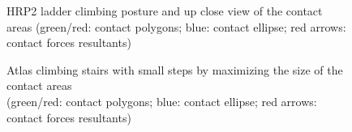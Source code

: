 \begin{figure}
\begin{subfigure}{.3325\columnwidth}
\label{fig:hrp2_darpa}
\end{subfigure}%
\begin{subfigure}{.6175\columnwidth}
  \centering
  \setlength\fboxsep{0pt}
  \setlength\fboxrule{1pt}
\label{fig:hrp2_darpa_zoom}
\end{subfigure}
\caption{HRP2 ladder climbing posture and up close view of the contact areas (green/red: contact polygons; blue: contact ellipse; red arrows: contact forces resultants)}
\label{fig:hrp2_darpa_complete}
\end{figure}

\begin{figure}
\centering
\setlength\fboxsep{0pt}
\setlength\fboxrule{1pt}
\caption{Atlas climbing stairs with small steps by maximizing the size of the contact areas\\(green/red: contact polygons; blue: contact ellipse; red arrows: contact forces resultants)}
\label{fig:atlas_SmallStairs}
\end{figure}


